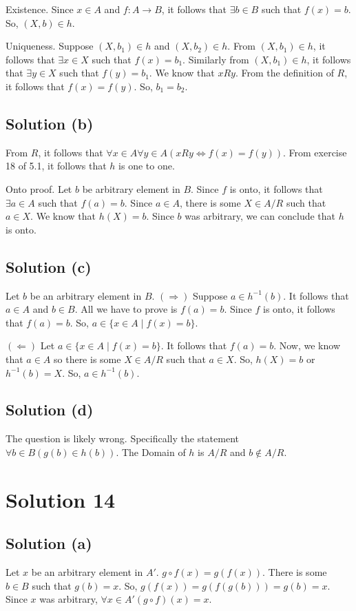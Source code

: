 \documentclass{article}
\begin{document}
Existence. Since $x \in A$ and $f: A \to B$, it follows that $\exists
b \in B$ such that $f(x) = b$. So, $(X,b) \in h$.

Uniqueness. Suppose $(X,b_1) \in h$ and $(X, b_2) \in h$. From $(X,
b_1) \in h$, it follows that $\exists x \in X$ such that $f(x)=b_1$.
Similarly from $(X,b_1) \in h$, it follows that $\exists y \in X$ such
that $f(y)=b_1$. We know that $xRy$. From the definition of $R$, it
follows that $f(x) = f(y)$. So, $b_1 = b_2$.

\subsection{Solution (b)}
From $R$, it follows that $\forall x \in A \forall y \in A(xRy \iff
f(x) = f(y))$. From exercise 18 of 5.1, it follows that $h$ is one to
one.

Onto proof. Let $b$ be arbitrary element in $B$. Since $f$ is onto, it
follows that $\exists a \in A$ such that $f(a)=b$. Since $a \in A$,
there is some $X \in A/R$ such that $a \in X$. We know that $h(X)=b$.
Since $b$ was arbitrary, we can conclude that $h$ is onto.

\subsection{Solution (c)}
Let $b$ be an arbitrary element in $B$.
$(\Rightarrow)$ Suppose $a \in h^{-1}(b)$. It follows that $a \in A$
and $b \in B$. All we have to prove is $f(a) = b$. Since $f$ is onto,
it follows that $f(a) =b$. So, $a \in \{x \in A \mid f(x) = b\}$.

$(\Leftarrow)$ Let $a \in \{x \in A \mid f(x) = b\}$. It follows that
$f(a)=b$. Now, we know that $a \in A$ so there is some $X \in A/R$
such that $a \in X$. So, $h(X) = b$ or $h^{-1}(b) = X$. So, $a \in h^{-1}(b)$.

\subsection{Solution (d)}
The question is likely wrong. Specifically the statement $\forall b
\in B(g(b) \in h(b))$. The Domain of $h$ is $A/R$ and $b \notin A/R$.

\section{Solution 14}
\subsection{Solution (a)}
Let $x$ be an arbitrary element in $A'$. $g \circ f(x) = g(f(x))$.
There is some $b \in B$ such that $g(b) = x$. So, $g(f(x)) =
g(f(g(b))) = g(b) = x$. Since $x$ was arbitrary, $\forall x \in A'(g
\circ f)(x) = x$.
\end{document}
